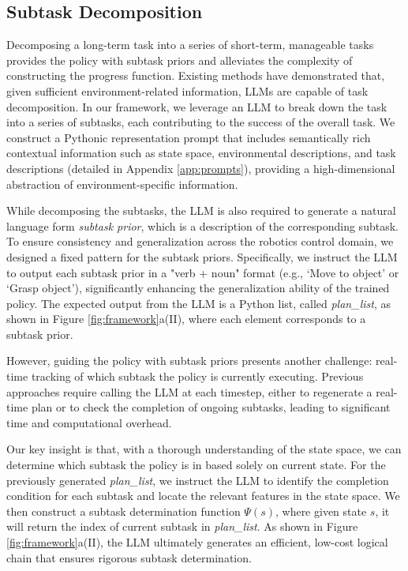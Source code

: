 \subsection{Subtask Decomposition}\label{sec:subtask-decomposition}
Decomposing a long-term task into a series of short-term, manageable tasks provides the policy with subtask priors and alleviates the complexity of constructing the progress function.
Existing methods\cite{brohan2023can, dalal2024plan} have demonstrated that, given sufficient environment-related information, LLMs are capable of task decomposition.
In our framework, we leverage an LLM to break down the task into a series of subtasks, each contributing to the success of the overall task.
We construct a Pythonic representation prompt that includes semantically rich contextual information such as state space, environmental descriptions, and task descriptions (detailed in Appendix \ref{app:prompts}), providing a high-dimensional abstraction of environment-specific information.

While decomposing the subtasks, the LLM is also required to generate a natural language form \textit{subtask prior}, which is a description of the corresponding subtask.
To ensure consistency and generalization across the robotics control domain, we designed a fixed pattern for the subtask priors.
Specifically, we instruct the LLM to output each subtask prior in a "verb + noun" format (e.g., `Move to object' or `Grasp object'), significantly enhancing the generalization ability of the trained policy.
The expected output from the LLM is a Python list, called \textit{plan\_list}, as shown in Figure \ref{fig:framework}a(II), where each element corresponds to a subtask prior.

However, guiding the policy with subtask priors presents another challenge: real-time tracking of which subtask the policy is currently executing.
Previous approaches require calling the LLM at each timestep, either to regenerate a real-time plan\cite{du2023guiding} or to check the completion of ongoing subtasks\cite{dalal2024plan}, leading to significant time and computational overhead.

Our key insight is that, with a thorough understanding of the state space, we can determine which subtask the policy is in based solely on current state.
For the previously generated \textit{plan\_list}, we instruct the LLM to identify the completion condition for each subtask and locate the relevant features in the state space.
We then construct a subtask determination function $\Psi(s)$, where given state $s$, it will return the index of current subtask in \textit{plan\_list}.
As shown in Figure \ref{fig:framework}a(II), the LLM ultimately generates an efficient, low-cost logical chain that ensures rigorous subtask determination.

